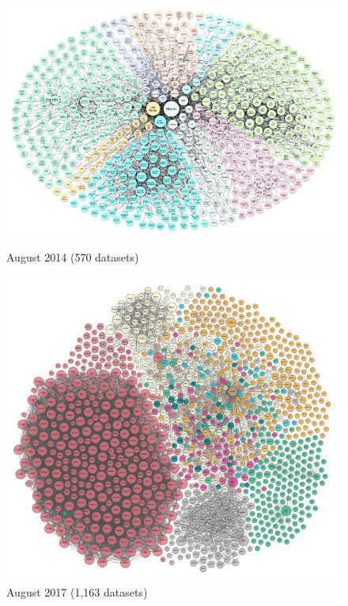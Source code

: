 \begin{figure}
{}
\noindent \begin{minipage}{.5\textwidth}
  \centering
  \includegraphics[width=\linewidth]{Figures/LOD/fig_LOD_2014_clean.png}
  \caption*{August 2014 (570 datasets)}
  \label{fig:test1}
\end{minipage}%
\hspace{0.5cm}
\begin{minipage}{.5\textwidth}
  \includegraphics[width=\linewidth]{Figures/LOD/fig_LOD_2017_clean.png}
  \caption*{August 2017 (1,163 datasets)}
  \label{fig:test2}
\end{minipage}
\end{figure}

